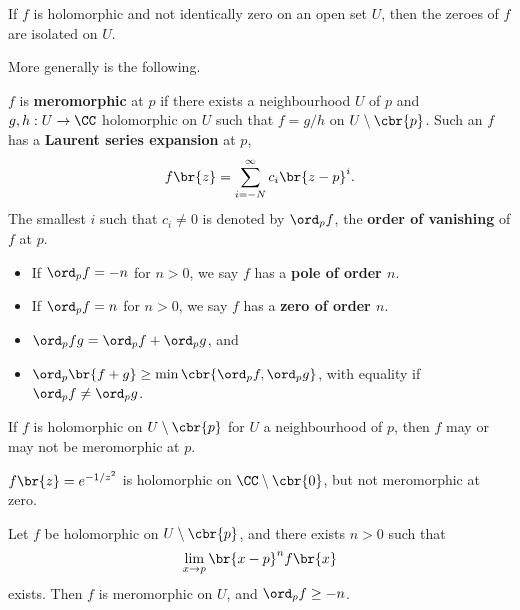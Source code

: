 \begin{corollary}
If $ f $ is holomorphic and not identically zero on an open set $ U $, then the zeroes of $ f $ are isolated on $ U $.
\end{corollary}

More generally is the following.

\begin{definition}
$ f $ is \textbf{meromorphic} at $ p $ if there exists a neighbourhood $ U $ of $ p $ and $ g, h : U \to \CC $ holomorphic on $ U $ such that $ f = g / h $ on $ U \setminus \cbr{p} $. Such an $ f $ has a \textbf{Laurent series expansion} at $ p $,
$$ f\br{z} = \sum_{i = -N}^\infty c_i\br{z - p}^i. $$
The smallest $ i $ such that $ c_i \ne 0 $ is denoted by $ \ord_p f $, the \textbf{order of vanishing} of $ f $ at $ p $.
\begin{itemize}
\item If $ \ord_p f = -n $ for $ n > 0 $, we say $ f $ has a \textbf{pole of order $ n $}.
\item If $ \ord_p f = n $ for $ n > 0 $, we say $ f $ has a \textbf{zero of order $ n $}.
\end{itemize}
\end{definition}

\begin{proposition}
\hfill
\begin{itemize}
\item $ \ord_p fg = \ord_p f + \ord_p g $, and
\item $ \ord_p \br{f + g} \ge \min\cbr{\ord_p f, \ord_p g} $, with equality if $ \ord_p f \ne \ord_p g $.
\end{itemize}
\end{proposition}

If $ f $ is holomorphic on $ U \setminus \cbr{p} $ for $ U $ a neighbourhood of $ p $, then $ f $ may or may not be meromorphic at $ p $.

\begin{example*}
$ f\br{z} = e^{-1 / z^2} $ is holomorphic on $ \CC \setminus \cbr{0} $, but not meromorphic at zero.
\end{example*}

\begin{theorem}
Let $ f $ be holomorphic on $ U \setminus \cbr{p} $, and there exists $ n > 0 $ such that
$$ \lim_{x \to p} \br{x - p}^nf\br{x} $$
exists. Then $ f $ is meromorphic on $ U $, and $ \ord_p f \ge -n $.
\end{theorem}

\pagebreak

